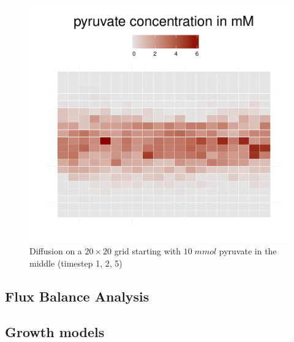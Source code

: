 \begin{figure}[h]
\begin{minipage}[t]{0.3\textwidth}
  \end{minipage}
  \begin{minipage}[t]{0.3\textwidth}
    \includegraphics[width=\textwidth]{diff5.pdf}
  \end{minipage}
  \caption{Diffusion on a $20\times20$ grid starting with $10\; mmol$ pyruvate in the middle (timestep 1, 2, 5)}
\end{figure}
\subsection{Flux Balance Analysis}
\subsection{Growth models}
\clearpage
